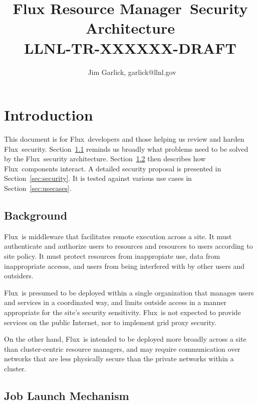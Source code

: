 \documentclass[10pt]{article}
\newcommand{\flux}{Flux}
\newcommand{\fluxfull}{Flux Resource Manager}
\begin{document}
\title{\fluxfull\ Security Architecture\\
{\large LLNL-TR-XXXXXX-DRAFT}}
\author{\
Jim Garlick, garlick@llnl.gov}


\maketitle

\section{Introduction}

This document is for \flux\ developers and those helping us review and
harden \flux\ security.
Section~\ref{sec:background} reminds us broadly what problems need
to be solved by the \flux\ security architecture.
Section~\ref{sec:softarch} then describes how \flux\ components
interact.
A detailed security proposal is presented in Section~\ref{sec:security}.
It is tested against various use cases in Section~\ref{sec:usecases}.

\subsection{Background}
\label{sec:background}

\flux\ is middleware that facilitates remote execution across a site.
It must authenticate
and authorize users to resources and resources to users according to
site policy.  It must protect resources from inappropiate use,
data from inappropriate accesss, and users from being interfered with
by other users and outsiders.

\flux\ is presumed to be deployed within a single organization that
manages users and services in a coordinated way, and limits outside
access in a manner appropriate for the site's security sensitivity.
\flux\ is not expected to provide services on the public Internet,
nor to implement grid proxy security.

On the other hand, \flux\ is intended to be deployed more broadly
across a site than cluster-centric resource managers, and may
require communication over networks that are less physically secure
than the private networks within a cluster.

\subsection{Job Launch Mechanism}
\label{sec:softarch}
\end{document}
